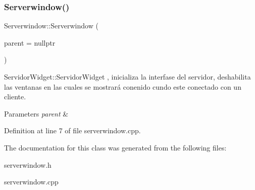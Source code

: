 \subsubsection{\texorpdfstring{Serverwindow()}{Serverwindow()}}
{\footnotesize\ttfamily Serverwindow\+::\+Serverwindow (\begin{DoxyParamCaption}\item[{Q\+Widget $\ast$}]{parent = {\ttfamily nullptr} }\end{DoxyParamCaption})\hspace{0.3cm}{\ttfamily [explicit]}}



Servidor\+Widget\+::\+Servidor\+Widget , inicializa la interfase del servidor, deshabilita las ventanas en las cuales se mostrará conenido cundo este conectado con un cliente. 


\begin{DoxyParams}{Parameters}
{\em parent} & \\
\hline
\end{DoxyParams}


Definition at line 7 of file serverwindow.\+cpp.



The documentation for this class was generated from the following files\+:\begin{DoxyCompactItemize}
\item 
serverwindow.\+h\item 
serverwindow.\+cpp\end{DoxyCompactItemize}
